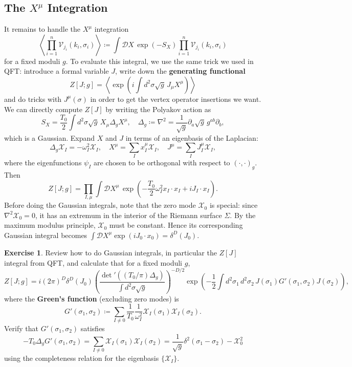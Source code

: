 \documentclass{report}
\theoremstyle{plain}
\theoremstyle{definition}
\newtheorem{exercise}{Exercise}[section]
\theoremstyle{remark}
\newcommand{\di}{\partial}
\newcommand{\cD}{\mathcal{D}}
\newcommand{\cV}{\mathcal{V}}
\newcommand{\cX}{\mathcal{X}}
\begin{document}
\subsection{The $X^\mu$ Integration}

It remains to handle the $X^\mu$ integration
\[ \left\langle \prod_{i=1}^n \cV_{j_i}(k_i, \sigma_i) \right\rangle \coloneqq \int \cD X \, \exp(-S_X) \prod_{i=1}^n \cV_{j_i}(k_i, \sigma_i) \]
for a fixed moduli $g$. To evaluate this integral, we use the same
trick we used in QFT: introduce a formal variable $J$, write down the
{\bf generating functional}
\[ Z[J; g] = \left\langle \exp\left(i\int d^2\sigma \sqrt{g} \, J_\mu X^\mu\right) \right\rangle \]
and do tricks with $J^\mu(\sigma)$ in order to get the vertex operator
insertions we want. We can directly compute $Z[J]$ by writing the
Polyakov action as
\[ S_X = \frac{T_0}{2} \int d^2\sigma \sqrt{g} \, X_\mu \Delta_g X^\mu, \quad \Delta_g \coloneqq \nabla^2 = \frac{1}{\sqrt{g}} \di_a \sqrt{g} \, g^{ab} \di_b, \]
which is a Gaussian. Expand $X$ and $J$ in terms of an eigenbasis of
the Laplacian:
\[ \Delta_g \cX_I = -\omega_I^2 \cX_I, \quad X^\mu = \sum_I x_I^\mu \cX_I, \quad J^\mu = \sum_I J_I^\mu \cX_I, \]
where the eigenfunctions $\psi_I$ are chosen to be orthogonal with
respect to $(\cdot, \cdot)_g$. Then
\[ Z[J; g] = \prod_{I,\mu} \int \cD X^\mu \, \exp\left(-\frac{T_0}{2} \omega_I^2 x_I \cdot x_I + iJ_I \cdot x_I\right). \]
Before doing the Gaussian integrals, note that the zero mode $\cX_0$
is special: since $\nabla^2 \cX_0 = 0$, it has an extremum in the
interior of the Riemann surface $\Sigma$. By the maximum modulus
principle, $\cX_0$ must be constant. Hence its corresponding Gaussian
integral becomes $\int \cD X^\mu \exp(iJ_0 \cdot x_0) =
\delta^D(J_0)$.

\begin{exercise}
  Review how to do Gaussian integrals, in particular the $Z[J]$
  integral from QFT, and calculate that for a fixed moduli $g$,
  \[ Z[J; g] = i(2\pi)^D \delta^D(J_0) \left(\frac{\det\nolimits' ((T_0/\pi)\Delta_g)}{\int d^2\sigma \sqrt{g}}\right)^{-D/2} \exp\left(-\frac{1}{2} \int d^2 \sigma_1 \, d^2\sigma_2 \, J(\sigma_1) G'(\sigma_1, \sigma_2) J(\sigma_2)\right), \]
  where the {\bf Green's function} (excluding zero modes) is
  \[ G'(\sigma_1, \sigma_2) \coloneqq \sum_{I \neq 0} \frac{1}{T_0} \frac{1}{\omega_I^2} \cX_I(\sigma_1) \cX_I(\sigma_2). \]
  Verify that $G'(\sigma_1, \sigma_2)$ satisfies
  \[ -T_0 \Delta_g G'(\sigma_1, \sigma_2) = \sum_{I \neq 0} \cX_I(\sigma_1) \cX_I(\sigma_2) = \frac{1}{\sqrt{g}} \delta^2(\sigma_1 - \sigma_2) - \cX_0^2 \]
  using the completeness relation for the eigenbasis $\{\cX_I\}$.
\end{exercise}
\end{document}
